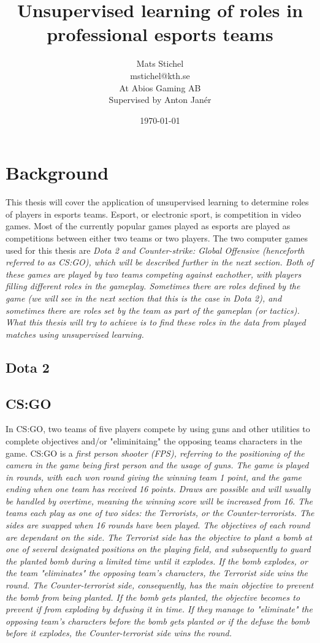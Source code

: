 \documentclass{article}
\title{Unsupervised learning of roles in professional esports teams}
\author{Mats Stichel \\ mstichel@kth.se \\ At Abios Gaming AB \\ Supervised by Anton Janér}
\date{\today}
\begin{document}
\maketitle

\section{Background}
This thesis will cover the application of unsupervised learning to determine roles of players in esports teams. Esport, or electronic sport, is competition in video games. Most of the currently popular games played as esports are played as competitions between either two teams or two players. The two computer games used for this thesis are \it{Dota 2} and \it{Counter-strike: Global Offensive} (henceforth referred to as CS:GO), which will be described further in the next section. Both of these games are played by two teams competing against eachother, with players filling different roles in the gameplay. Sometimes there are roles defined by the game (we will see in the next section that this is the case in Dota 2), and sometimes there are roles set by the team as part of the gameplan (or tactics). What this thesis will try to achieve is to find these roles in the data from played matches using unsupervised learning.

\subsection{Dota 2}


\subsection{CS:GO}
In CS:GO, two teams of five players compete by using guns and other utilities to complete objectives and/or "eliminitaing" the opposing teams characters in the game. CS:GO is a \it{first person shooter} (FPS), referring to the positioning of the camera in the game being first person and the usage of guns. The game is played in rounds, with each won round giving the winning team 1 point, and the game ending when one team has received 16 points. Draws are possible and will usually be handled by overtime, meaning the winning score will be increased from 16. The teams each play as one of two sides: the \it{Terrorists}, or the \it{Counter-terrorists}. The sides are swapped when 16 rounds have been played. The objectives of each round are dependant on the side. The \it{Terrorist} side has the objective to plant a bomb at one of several designated positions on the playing field, and subsequently to guard the planted bomb during a limited time until it explodes. If the bomb explodes, or the team "eliminates" the opposing team's characters, the \it{Terrorist} side wins the round. The \it{Counter-terrorist} side, consequently, has the main objective to prevent the bomb from being planted. If the bomb gets planted, the objective becomes to prevent if from exploding by defusing it in time. If they manage to "eliminate" the opposing team's characters before the bomb gets planted \it{or} if the defuse the bomb before it explodes, the \it{Counter-terrorist} side wins the round.
\end{document}
